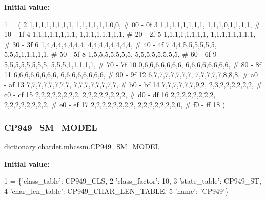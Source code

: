 {\bfseries Initial value\+:}
\begin{DoxyCode}
1 =  (
2     1,1,1,1,1,1,1,1, 1,1,1,1,1,1,0,0,  \textcolor{comment}{# 00 - 0f}
3     1,1,1,1,1,1,1,1, 1,1,1,0,1,1,1,1,  \textcolor{comment}{# 10 - 1f}
4     1,1,1,1,1,1,1,1, 1,1,1,1,1,1,1,1,  \textcolor{comment}{# 20 - 2f}
5     1,1,1,1,1,1,1,1, 1,1,1,1,1,1,1,1,  \textcolor{comment}{# 30 - 3f}
6     1,4,4,4,4,4,4,4, 4,4,4,4,4,4,4,4,  \textcolor{comment}{# 40 - 4f}
7     4,4,5,5,5,5,5,5, 5,5,5,1,1,1,1,1,  \textcolor{comment}{# 50 - 5f}
8     1,5,5,5,5,5,5,5, 5,5,5,5,5,5,5,5,  \textcolor{comment}{# 60 - 6f}
9     5,5,5,5,5,5,5,5, 5,5,5,1,1,1,1,1,  \textcolor{comment}{# 70 - 7f}
10     0,6,6,6,6,6,6,6, 6,6,6,6,6,6,6,6,  \textcolor{comment}{# 80 - 8f}
11     6,6,6,6,6,6,6,6, 6,6,6,6,6,6,6,6,  \textcolor{comment}{# 90 - 9f}
12     6,7,7,7,7,7,7,7, 7,7,7,7,7,8,8,8,  \textcolor{comment}{# a0 - af}
13     7,7,7,7,7,7,7,7, 7,7,7,7,7,7,7,7,  \textcolor{comment}{# b0 - bf}
14     7,7,7,7,7,7,9,2, 2,3,2,2,2,2,2,2,  \textcolor{comment}{# c0 - cf}
15     2,2,2,2,2,2,2,2, 2,2,2,2,2,2,2,2,  \textcolor{comment}{# d0 - df}
16     2,2,2,2,2,2,2,2, 2,2,2,2,2,2,2,2,  \textcolor{comment}{# e0 - ef}
17     2,2,2,2,2,2,2,2, 2,2,2,2,2,2,2,0,  \textcolor{comment}{# f0 - ff}
18 )
\end{DoxyCode}
\mbox{\label{namespacechardet_1_1mbcssm_a40b2519bf1ed456f97288613c795ea39}} 
\subsubsection{\texorpdfstring{C\+P949\+\_\+\+S\+M\+\_\+\+M\+O\+D\+EL}{CP949\_SM\_MODEL}}
{\footnotesize\ttfamily dictionary chardet.\+mbcssm.\+C\+P949\+\_\+\+S\+M\+\_\+\+M\+O\+D\+EL}

{\bfseries Initial value\+:}
\begin{DoxyCode}
1 =  \{\textcolor{stringliteral}{'class\_table'}: CP949\_CLS,
2                   \textcolor{stringliteral}{'class\_factor'}: 10,
3                   \textcolor{stringliteral}{'state\_table'}: CP949\_ST,
4                   \textcolor{stringliteral}{'char\_len\_table'}: CP949\_CHAR\_LEN\_TABLE,
5                   \textcolor{stringliteral}{'name'}: \textcolor{stringliteral}{'CP949'}\}
\end{DoxyCode}
\mbox{\label{namespacechardet_1_1mbcssm_a816427a2aaa75049d6c48e00856ee6b1}} 
